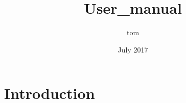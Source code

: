\documentclass{article}
\title{User_manual}
\author{tom }
\date{July 2017}
\begin{document}
\maketitle

\section{Introduction}
\end{document}
